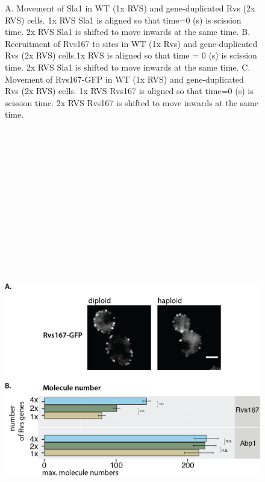 \begin{figure}[H]
						\caption[Dynamics of endocytosis in diploid strains with gene duplicated Rvs]
						{A. Movement of Sla1 in WT (1x RVS) and gene-duplicated Rvs (2x RVS) cells. 1x RVS Sla1 is aligned so that time=0 (s) is scission time. 2x RVS Sla1 is shifted to move inwards at the same time.
						B. Recruitment of Rvs167 to sites in WT (1x Rvs)  and gene-duplicated Rvs (2x RVS) cells.1x RVS is aligned so that time = 0 (s) is scission time. 2x RVS Sla1 is shifted to move inwards at the same time.
						C.  Movement of Rvs167-GFP in WT (1x RVS) and gene-duplicated Rvs (2x RVS) cells. 1x RVS Rvs167 is aligned so that time=0 (s) is scission time. 2x RVS Rvs167 is shifted to move inwards at the same time.
						\label{fig_rvsdiploid}}
						\end{figure}
				
						\begin{figure}[H]
	\centering
	\includegraphics[width=22cm,height=22cm,keepaspectratio]{figures/results_final/protein_frictionB}

\end{figure}

